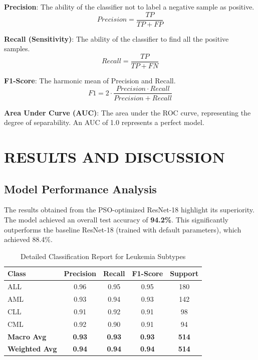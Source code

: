 \documentclass[twocolumn,10pt,a4paper]{article}
\begin{document}
\textbf{Precision}: The ability of the classifier not to label a negative sample as positive.
\begin{equation}
Precision = \frac{TP}{TP + FP}
\end{equation}

\textbf{Recall (Sensitivity)}: The ability of the classifier to find all the positive samples.
\begin{equation}
Recall = \frac{TP}{TP + FN}
\end{equation}

\textbf{F1-Score}: The harmonic mean of Precision and Recall.
\begin{equation}
F1 = 2 \cdot \frac{Precision \cdot Recall}{Precision + Recall}
\end{equation}

\textbf{Area Under Curve (AUC)}: The area under the ROC curve, representing the degree of separability. An AUC of 1.0 represents a perfect model.

\section{RESULTS AND DISCUSSION}
\subsection{Model Performance Analysis}
The results obtained from the PSO-optimized ResNet-18 highlight its superiority. The model achieved an overall test accuracy of \textbf{94.2\%}. This significantly outperforms the baseline ResNet-18 (trained with default parameters), which achieved 88.4\%.

\begin{table}[H]
\caption{Detailed Classification Report for Leukemia Subtypes}
\centering
\begin{tabular}{lcccc}
\toprule
\textbf{Class} & \textbf{Precision} & \textbf{Recall} & \textbf{F1-Score} & \textbf{Support} \\
\midrule
ALL & 0.96 & 0.95 & 0.95 & 180 \\
AML & 0.93 & 0.94 & 0.93 & 142 \\
CLL & 0.91 & 0.92 & 0.91 & 98 \\
CML & 0.92 & 0.90 & 0.91 & 94 \\
\midrule
\textbf{Macro Avg} & \textbf{0.93} & \textbf{0.93} & \textbf{0.93} & \textbf{514} \\
\textbf{Weighted Avg} & \textbf{0.94} & \textbf{0.94} & \textbf{0.94} & \textbf{514} \\
\bottomrule
\end{tabular}
\end{table}
\end{document}
